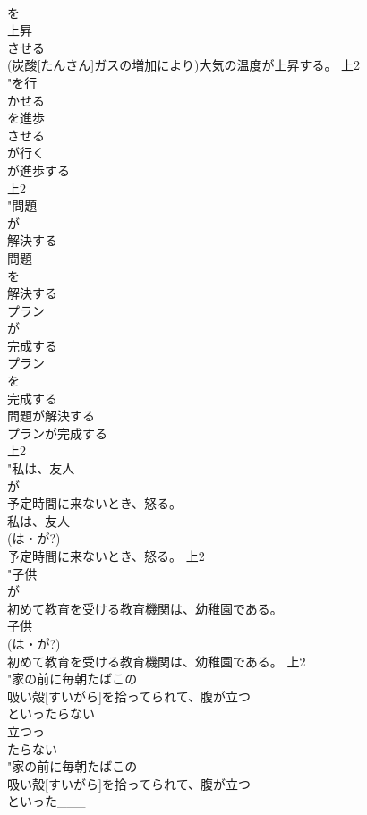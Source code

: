 \documentclass[8pt]{extreport}
\begin{document}
\begin{CJK}{UTF8}{min}
\\	を
\\	上昇
\\	させる
\\	(炭酸[たんさん]ガスの増加により)大気の温度が上昇する。			上2
\\	"を行
\\	かせる
\\	を進歩
\\	させる
\\	が行く
\\	が進歩する
\\	上2
\\	"問題
\\	が
\\	解決する　
\\	問題
\\	を
\\	解決する　
\\	プラン
\\	が
\\	完成する　
\\	プラン
\\	を
\\	完成する　
\\	問題が解決する
\\	プランが完成する
\\	上2
\\	"私は、友人
\\	が
\\	予定時間に来ないとき、怒る。
\\	私は、友人
\\	(は・が?)
\\	予定時間に来ないとき、怒る。			上2
\\	"子供
\\	が
\\	初めて教育を受ける教育機関は、幼稚園である。
\\	子供
\\	(は・が?)
\\	初めて教育を受ける教育機関は、幼稚園である。			上2
\\	"家の前に毎朝たばこの
\\	吸い殻[すいがら]を拾ってられて、腹が立つ
\\	といったらない
\\	立つっ
\\	たらない
\\	"家の前に毎朝たばこの
\\	吸い殻[すいがら]を拾ってられて、腹が立つ
\\	といった___

\end{CJK}
\end{document}
